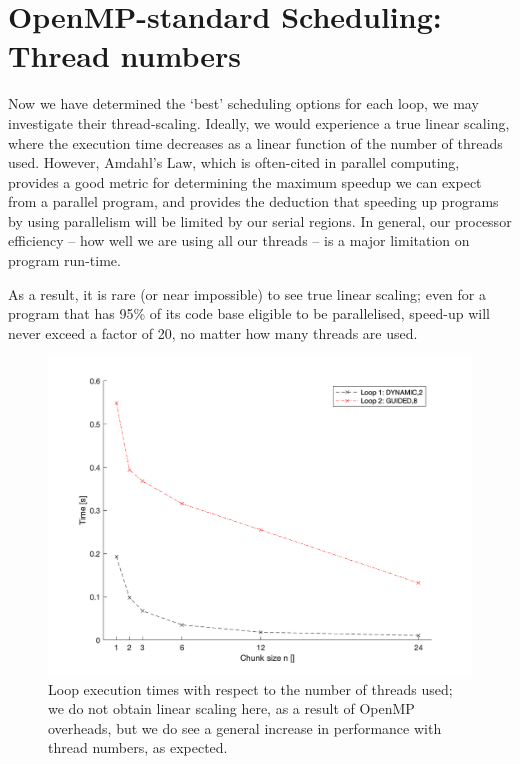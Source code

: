 \documentclass{article} %
\begin{document}
\section*{OpenMP-standard Scheduling: Thread numbers}

Now we have determined the `best' scheduling options for each loop, we may investigate their thread-scaling.
Ideally, we would experience a true linear scaling, where the execution time decreases as a linear function of the number of threads used.
However, Amdahl's Law, which is often-cited in parallel computing, provides a good metric for determining the maximum speedup we can expect from a parallel program, and provides the deduction that speeding up programs by using parallelism will be limited by our serial regions. 
In general, our processor efficiency -- how well we are using all our threads -- is a major limitation on program run-time.

As a result, it is rare (or near impossible) to see true linear scaling; even for a program that has 95\% of its code base eligible to be parallelised, speed-up will never exceed a factor of 20, no matter how many threads are used.

\begin{figure}
    \centering
    \includegraphics[height=.35\textheight]{part1_plots/bestruns_all}
    \caption{Loop execution times with respect to the number of threads used; we do not obtain linear scaling here, as a result of OpenMP overheads, but we do see a general increase in performance with thread numbers, as expected.}
    \label{fig:threadall}
\end{figure}
\end{document}
